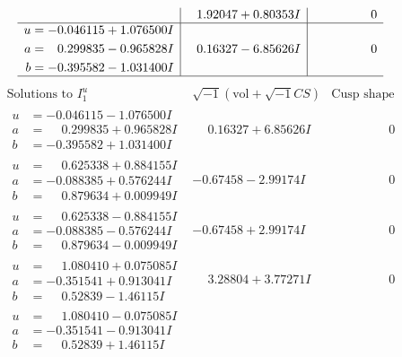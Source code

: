 \documentclass[1p]{elsarticle_modified}
\theoremstyle{definition}
\newcommand{\I}{\sqrt{-1}}
\begin{document}
$$\begin{array}{c|c|c}
 & \phantom{-}1.92047 + 0.80353 I & \phantom{-0.000000 } 0 \\ \hline\begin{aligned}
u &= -0.046115 + 1.076500 I \\
a &= \phantom{-}0.299835 - 0.965828 I \\
b &= -0.395582 - 1.031400 I\end{aligned}
 & \phantom{-}0.16327 - 6.85626 I & \phantom{-0.000000 } 0\\
 \hline 
 \end{array}$$\newpage$$\begin{array}{c|c|c}  
\text{Solutions to }I^u_{1}& \I (\text{vol} + \sqrt{-1}CS) & \text{Cusp shape}\\
 \hline 
\begin{aligned}
u &= -0.046115 - 1.076500 I \\
a &= \phantom{-}0.299835 + 0.965828 I \\
b &= -0.395582 + 1.031400 I\end{aligned}
 & \phantom{-}0.16327 + 6.85626 I & \phantom{-0.000000 } 0 \\ \hline\begin{aligned}
u &= \phantom{-}0.625338 + 0.884155 I \\
a &= -0.088385 + 0.576244 I \\
b &= \phantom{-}0.879634 + 0.009949 I\end{aligned}
 & -0.67458 - 2.99174 I & \phantom{-0.000000 } 0 \\ \hline\begin{aligned}
u &= \phantom{-}0.625338 - 0.884155 I \\
a &= -0.088385 - 0.576244 I \\
b &= \phantom{-}0.879634 - 0.009949 I\end{aligned}
 & -0.67458 + 2.99174 I & \phantom{-0.000000 } 0 \\ \hline\begin{aligned}
u &= \phantom{-}1.080410 + 0.075085 I \\
a &= -0.351541 + 0.913041 I \\
b &= \phantom{-}0.52839 - 1.46115 I\end{aligned}
 & \phantom{-}3.28804 + 3.77271 I & \phantom{-0.000000 } 0 \\ \hline\begin{aligned}
u &= \phantom{-}1.080410 - 0.075085 I \\
a &= -0.351541 - 0.913041 I \\
b &= \phantom{-}0.52839 + 1.46115 I\end{aligned}

\end{array}$$
\end{document}
